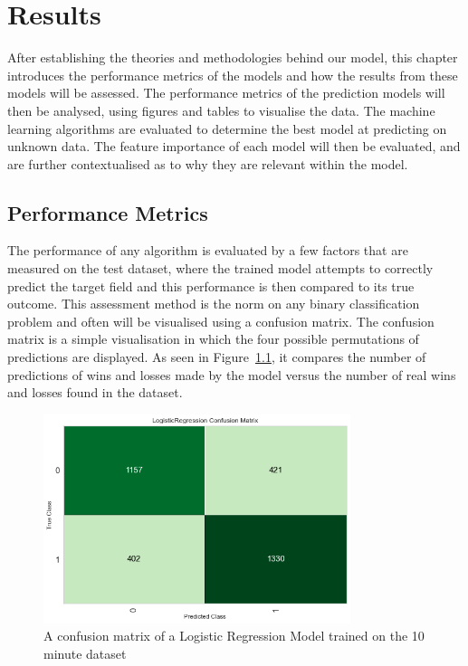 \chapter{Results}\label{ch:results}

After establishing the theories and methodologies behind our model, this chapter introduces the performance metrics of the models and how the results from these models will be assessed.
The performance metrics of the prediction models will then be analysed, using figures and tables to visualise the data.
The machine learning algorithms are evaluated to determine the best model at predicting on unknown data.
The feature importance of each model will then be evaluated, and are further contextualised as to why they are relevant within the model.

\section{Performance Metrics}\label{sec:Performance Metrics}

The performance of any algorithm is evaluated by a few factors that are measured on the test dataset, where the trained model attempts to correctly predict the target field and this performance is then compared to its true outcome.
This assessment method is the norm on any binary classification problem and often will be visualised using a confusion matrix.
The confusion matrix is a simple visualisation in which the four possible permutations of predictions are displayed.
As seen in Figure~\ref{fig:ConfusionMatrix10}, it compares the number of predictions of wins and losses made by the model versus the number of real wins and losses found in the dataset. \\

\begin{figure}[h]
    \centering
    \includegraphics[width=0.8\textwidth]{figures/ConfusionMatrix10}
    \caption{A confusion matrix of a Logistic Regression Model trained on the 10 minute dataset}
    \label{fig:ConfusionMatrix10}
\end{figure}

